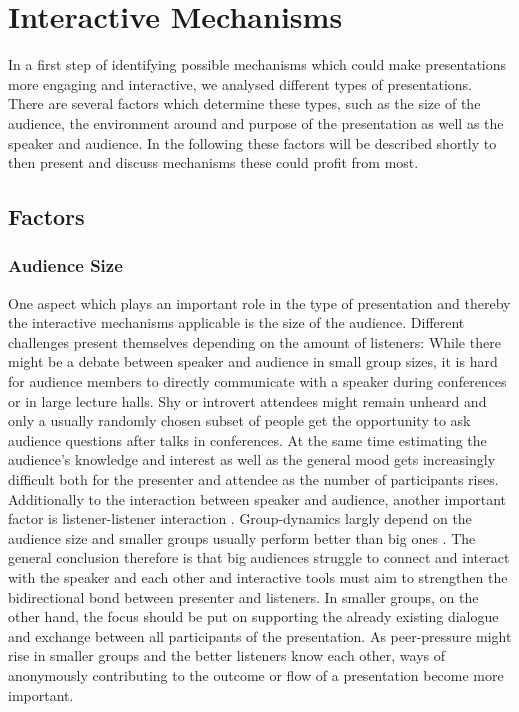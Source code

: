 \chapter{Interactive Mechanisms}
\label{cha:mechanisms}

In a first step of identifying possible mechanisms which could make presentations more engaging and interactive, we analysed different types of presentations. There are several factors which determine these types, such as the size of the audience, the environment around and purpose of the presentation as well as the speaker and audience. In the following these factors will be described shortly to then present and discuss mechanisms these could profit from most.

\section{Factors}

\subsection{Audience Size}
One aspect which plays an important role in the type of presentation and thereby the interactive mechanisms applicable is the size of the audience. Different challenges present themselves depending on the amount of listeners: While there might be a debate between speaker and audience in small group sizes, it is hard for audience members to directly communicate with a speaker during conferences or in large lecture halls. Shy or introvert attendees might remain unheard \cite{Bry:Backstage} and only a usually randomly chosen subset of people get the opportunity to ask audience questions after talks in conferences. At the same time estimating the audience's knowledge and interest as well as the general mood gets increasingly difficult both for the presenter and attendee as the number of participants rises. Additionally to the interaction between speaker and audience, another important factor is listener-listener interaction \cite{Moore:ThreeTypesOfInteraction}. Group-dynamics largly depend on the audience size and smaller groups usually perform better than big ones \cite{Phillips:GroupProblemSolving}.
The general conclusion therefore is that big audiences struggle to connect and interact with the speaker and each other and interactive tools must aim to strengthen the bidirectional bond between presenter and listeners. In smaller groups, on the other hand, the focus should be put on supporting the already existing dialogue and exchange between all participants of the presentation. As peer-pressure might rise in smaller groups and the better listeners know each other, ways of anonymously contributing to the outcome or flow of a presentation become more important.

